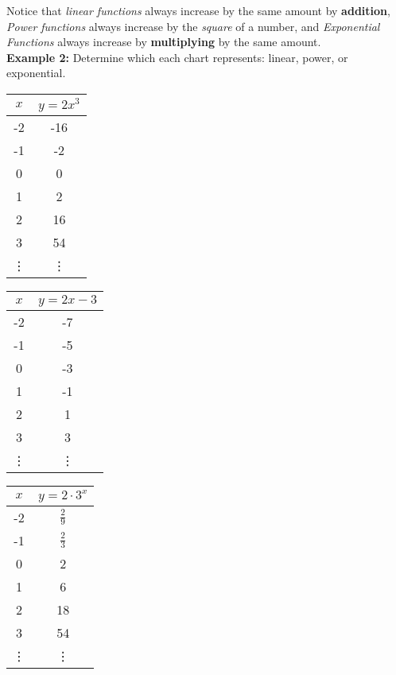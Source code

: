 \documentclass[12pt]{article}
\begin{document}
Notice that \textit{linear functions} always increase by the same amount by \textbf{addition}, \textit{Power functions} always increase by the \textit{square} of a number, and \textit{Exponential Functions} always increase by \textbf{multiplying} by the same amount.\\

\textbf{Example 2:} Determine which each chart represents: linear, power, or exponential.\\

\begin{multicols}{3}
\begin{center}



{\renewcommand{\arraystretch}{2}
\begin{tabular}{c | c}

	$x$  & $y=2x^3$ \\ \hline
	-2 & -16 \\
	-1 & -2 \\
	0 & 0 \\
	1 & 2 \\
	2 & 16 \\
	3 & 54 \\
	\vdots & \vdots

\end{tabular}} \quad

\columnbreak



{\renewcommand{\arraystretch}{2}
\begin{tabular}{c | c}

	$x$ & $y=2x-3$ \\ \hline
	-2 & -7 \\
	-1 & -5 \\
	0 & -3 \\
	1 & -1 \\
	2 & 1 \\
	3 & 3 \\
	\vdots & \vdots

\end{tabular}} \quad

\columnbreak



{\renewcommand{\arraystretch}{2}
\begin{tabular}{c | c}

	$x$ & $y=2 \cdot 3^x$ \\ \hline
	-2 & $\frac{2}{9}$ \\
	-1 & $\frac{2}{3}$ \\
	0 & 2 \\
	1 & 6 \\
	2 & 18 \\
	3 & 54 \\
	\vdots & \vdots

\end{tabular}} \quad

\end{center}
\end{multicols} 
\end{document}
